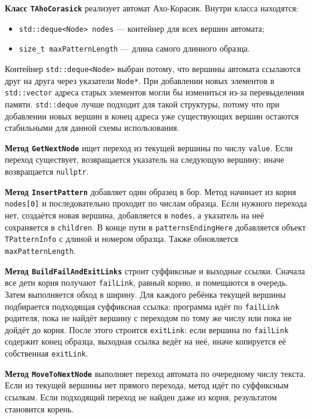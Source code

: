 \documentclass[12pt]{article}
\begin{document}
\textbf{Класс \texttt{TAhoCorasick}} реализует автомат Ахо-Корасик. Внутри класса находятся:
\begin{itemize}
    \item \texttt{std::deque<Node> nodes} --- контейнер для всех вершин автомата;
    \item \texttt{size\_t maxPatternLength} --- длина самого длинного образца.
\end{itemize}

Контейнер \texttt{std::deque<Node>} выбран потому, что вершины автомата ссылаются друг на друга через указатели \texttt{Node*}. При добавлении новых элементов в \texttt{std::vector} адреса старых элементов могли бы измениться из-за перевыделения памяти. \texttt{std::deque} лучше подходит для такой структуры, потому что при добавлении новых вершин в конец адреса уже существующих вершин остаются стабильными для данной схемы использования.

\textbf{Метод \texttt{GetNextNode}} ищет переход из текущей вершины по числу \texttt{value}. Если переход существует, возвращается указатель на следующую вершину; иначе возвращается \texttt{nullptr}.

\textbf{Метод \texttt{InsertPattern}} добавляет один образец в бор. Метод начинает из корня \texttt{nodes[0]} и последовательно проходит по числам образца. Если нужного перехода нет, создаётся новая вершина, добавляется в \texttt{nodes}, а указатель на неё сохраняется в \texttt{children}. В конце пути в \texttt{patternsEndingHere} добавляется объект \texttt{TPatternInfo} с длиной и номером образца. Также обновляется \texttt{maxPatternLength}.

\textbf{Метод \texttt{BuildFailAndExitLinks}} строит суффиксные и выходные ссылки. Сначала все дети корня получают \texttt{failLink}, равный корню, и помещаются в очередь. Затем выполняется обход в ширину. Для каждого ребёнка текущей вершины подбирается подходящая суффиксная ссылка: программа идёт по \texttt{failLink} родителя, пока не найдёт вершину с переходом по тому же числу или пока не дойдёт до корня. После этого строится \texttt{exitLink}: если вершина по \texttt{failLink} содержит конец образца, выходная ссылка ведёт на неё, иначе копируется её собственная \texttt{exitLink}.

\textbf{Метод \texttt{MoveToNextNode}} выполняет переход автомата по очередному числу текста. Если из текущей вершины нет прямого перехода, метод идёт по суффиксным ссылкам. Если подходящий переход не найден даже из корня, результатом становится корень.
\end{document}
